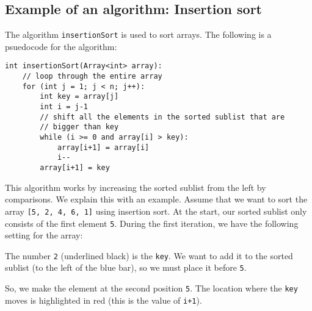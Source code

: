 \documentclass[a4paper, openany]{memoir}
\begin{document}
\subsection{Example of an algorithm: Insertion sort}
The algorithm \texttt{insertionSort} is used to sort arrays. The following is a psuedocode for the algorithm:
\begin{lstlisting}[language=pseudocode]
int insertionSort(Array<int> array):
    // loop through the entire array
    for (int j = 1; j < n; j++):
        int key = array[j]
        int i = j-1
        // shift all the elements in the sorted sublist that are 
        // bigger than key
        while (i >= 0 and array[i] > key):
            array[i+1] = array[i]
            i--
        array[i+1] = key
\end{lstlisting}
This algorithm works by increasing the sorted sublist from the left by comparisons. We explain this with an example. Assume that we want to sort the array \texttt{[5, 2, 4, 6, 1]} using insertion sort. At the start, our sorted sublist only consists of the first element \texttt{5}. During the first iteration, we have the following setting for the array:
\begin{center}
\end{center}
The number \texttt{2} (underlined black) is the \texttt{key}. We want to add it to the sorted sublist (to the left of the blue bar), so we must place it before \texttt{5}.
\begin{center}
\end{center}
So, we make the element at the second position \texttt{5}. The location where the \texttt{key} moves is highlighted in red (this is the value of \texttt{i+1}).
\begin{center}
\end{center}
\end{document}
